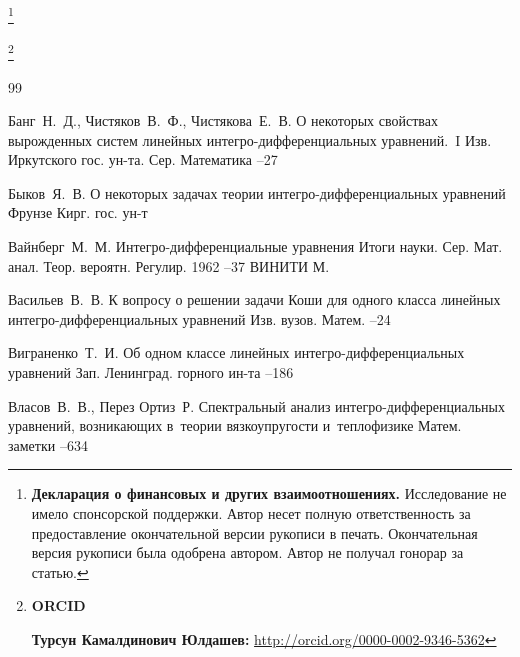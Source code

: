   

\thanks{{\bf Декларация о финансовых и других взаимоотношениях.}
Исследование не имело спонсорской поддержки.
Автор несет полную ответственность за предоставление окончательной версии рукописи в печать.
Окончательная версия рукописи была одобрена автором.
Автор не получал гонорар за статью.
}


\thanks{{\bf ORCID}

{\bf Турсун Камалдинович Юлдашев:} \url{http://orcid.org/0000-0002-9346-5362}

}


  
\RusRef

 \begin{thebibliography}{99}
 

\by Банг~Н.~Д., Чистяков~В.~Ф., Чистякова~Е.~В.
\paper О некоторых свойствах вырожденных систем линейных интегро-дифференциальных уравнений.~I
\jour Изв. Иркутского гос. ун-та. Сер. Математика
--27

\by Быков~Я.~В.
\book О некоторых задачах теории интегро-дифференциальных уравнений
\publaddr Фрунзе
\publ Кирг. гос. ун-т

\by Вайнберг~М.~М.
\paper Интегро-дифференциальные уравнения
\serial Итоги науки. Сер. Мат. анал. Теор. вероятн. Регулир. 1962
--37
\publ ВИНИТИ
\publaddr М.

\by Васильев~В.~В.
\paper К вопросу о решении задачи Коши для одного класса линейных интегро-дифференциальных уравнений
\jour Изв. вузов. Матем.
--24

\by Виграненко~Т.~И.
\paper Об одном классе линейных интегро-дифференциальных уравнений
\jour Зап. Ленинград. горного ин-та
--186

\by Власов~В.~В., Перез Ортиз~Р.
\paper Спектральный анализ интегро-дифференциальных уравнений, возникающих в~теории вязкоупругости и~теплофизике
\jour Матем. заметки
--634


\end{thebibliography}
